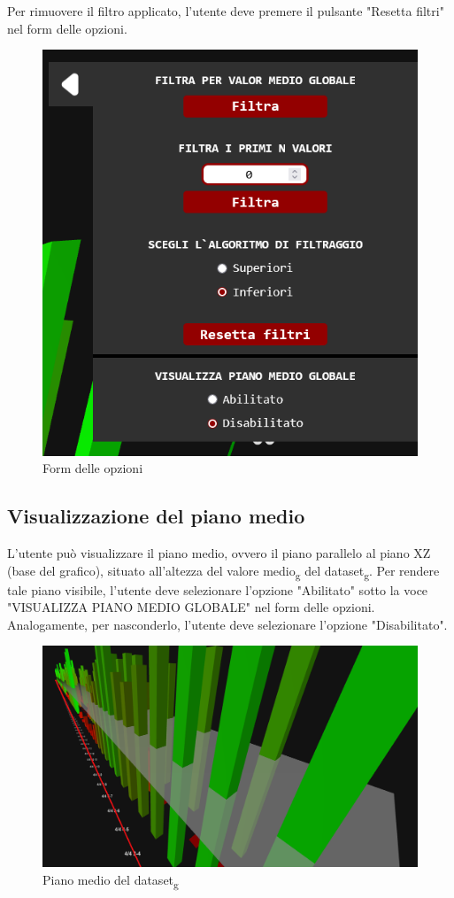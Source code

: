 Per rimuovere il filtro applicato, l'utente deve premere il pulsante "Resetta filtri" nel form delle opzioni.
\begin{figure}[H]
    \centering
    \includegraphics[scale=0.6]{template/images/env/options.png}
    \caption{Form delle opzioni}
\end{figure}

\subsection{Visualizzazione del piano medio}
L'utente può visualizzare il piano medio, ovvero il piano parallelo al
piano XZ (base del grafico), situato all'altezza del valore medio\textsubscript{g} del dataset\textsubscript{g}.
Per rendere tale piano visibile, l'utente deve selezionare l'opzione "Abilitato" sotto la voce
"VISUALIZZA PIANO MEDIO GLOBALE" nel form delle opzioni. Analogamente, per
nasconderlo, l'utente deve selezionare l'opzione "Disabilitato".
\begin{figure}[H]
    \centering
    \includegraphics[scale=0.45]{template/images/env/plane.png}
    \caption{Piano medio del dataset\textsubscript{g}}
\end{figure}

